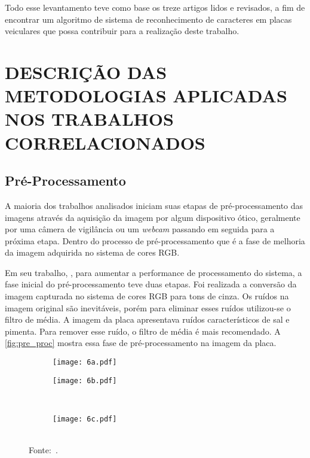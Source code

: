 Todo esse levantamento teve como base os treze artigos lidos e revisados, a fim de encontrar um algoritmo de sistema de reconhecimento de caracteres em placas veiculares que possa contribuir para a realização deste trabalho.

\section{\uppercase{Descrição das metodologias aplicadas nos trabalhos correlacionados}}

\subsection{\textbf{Pré-Processamento}}

A maioria dos trabalhos analisados iniciam suas etapas de pré-processamento das imagens através da aquisição da imagem por algum dispositivo ótico, geralmente por uma câmera de vigilância ou um \textit{webcam} passando em seguida para a próxima etapa. Dentro do processo de pré-processamento que é a fase de melhoria da imagem adquirida no sistema de cores RGB.

Em seu trabalho, , para aumentar a performance de processamento do sistema, a fase inicial do pré-processamento teve duas etapas. Foi realizada a conversão da imagem capturada no sistema de cores RGB para tons de cinza. Os ruídos na imagem original são inevitáveis, porém para eliminar esses ruídos utilizou-se o filtro de média. A imagem da placa apresentava ruídos característicos de sal e pimenta. Para remover esse ruído, o filtro de média é mais recomendado. A \autoref{fig:pre_proc} mostra essa fase de pré-processamento na imagem da placa.

\begin{figure}[htb]
	\centering
	\caption[\footnotesize Etapas do Pré-processamento de uma Imagem da Placa Veicular.]{\footnotesize Etapas do pré-processamento de uma imagem da placa veicular. a) Imagem Original; b) Imagem original em tons de Cinza; c) Imagem filtrada com o Filtro de Media.}   %
	\label{fig:pre_proc}
	\begin{subfigure}{.4\textwidth}
		\centering
		\texttt{[image: 6a.pdf]}
		\caption{ }
	\end{subfigure}
	\begin{subfigure}{.4\textwidth}
		\centering
		\texttt{[image: 6b.pdf]}
		\caption{ }
	\end{subfigure}
	\\
	\begin{subfigure}{.4\textwidth}
		\centering
		\texttt{[image: 6c.pdf]}
		\caption{ }
	\end{subfigure}
	\\
	{\footnotesize Fonte:~.}
\end{figure}

